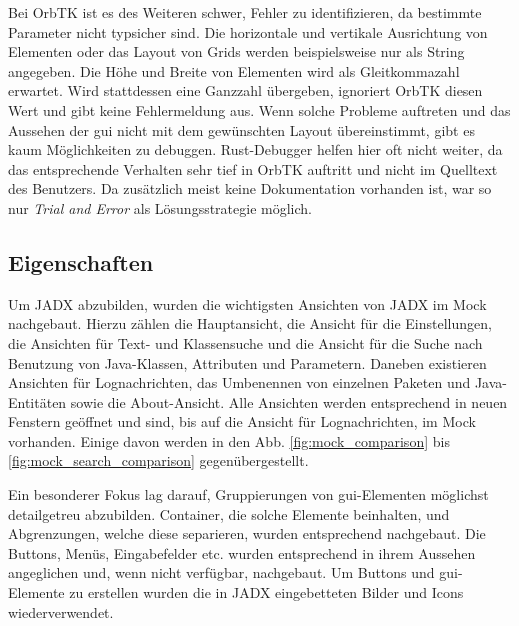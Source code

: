 Bei OrbTK ist es des Weiteren schwer, Fehler zu identifizieren, da bestimmte Parameter nicht typsicher sind. Die horizontale und vertikale Ausrichtung von Elementen oder das Layout von Grids werden beispielsweise nur als String angegeben. Die Höhe und Breite von Elementen wird als Gleitkommazahl erwartet. Wird stattdessen eine Ganzzahl übergeben, ignoriert OrbTK diesen Wert und gibt keine Fehlermeldung aus. Wenn solche Probleme auftreten und das Aussehen der \gls{gui} nicht mit dem gewünschten Layout übereinstimmt, gibt es kaum Möglichkeiten zu debuggen. Rust-Debugger helfen hier oft nicht weiter, da das entsprechende Verhalten sehr tief in OrbTK auftritt und nicht im Quelltext des Benutzers. Da zusätzlich meist keine Dokumentation vorhanden ist, war so nur \emph{Trial and Error} als Lösungsstrategie möglich.

\subsection{Eigenschaften}

Um JADX abzubilden, wurden die wichtigsten Ansichten von JADX im Mock nachgebaut. Hierzu zählen die Hauptansicht, die Ansicht für die Einstellungen, die Ansichten für Text- und Klassensuche und die Ansicht für die Suche nach Benutzung von Java-Klassen, Attributen und Parametern. Daneben existieren Ansichten für Lognachrichten, das Umbenennen von einzelnen Paketen und Java-Entitäten sowie die About-Ansicht. Alle Ansichten werden entsprechend in neuen Fenstern geöffnet und sind, bis auf die Ansicht für Lognachrichten, im Mock vorhanden. Einige davon werden in den Abb. \ref{fig:mock_comparison} bis \ref{fig:mock_search_comparison} gegenübergestellt.

Ein besonderer Fokus lag darauf, Gruppierungen von \gls{gui}-Elementen möglichst detailgetreu abzubilden. Container, die solche Elemente beinhalten, und Abgrenzungen, welche diese separieren, wurden entsprechend nachgebaut. Die Buttons, Menüs, Eingabefelder etc. wurden entsprechend in ihrem Aussehen angeglichen und, wenn nicht verfügbar, nachgebaut. Um Buttons und \gls{gui}-Elemente zu erstellen wurden die in JADX eingebetteten Bilder und Icons wiederverwendet.



